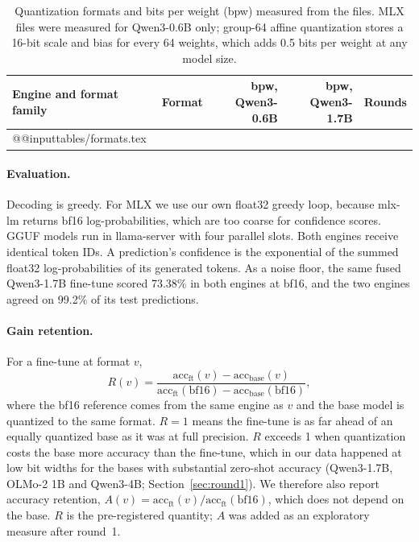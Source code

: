 \documentclass[11pt,letterpaper]{article}
\makeatletter
\newcommand*{\tablerows}[1]{\csname @@input\endcsname #1 }
\makeatother
\begin{document}
\begin{table}[htbp]
\centering\small
\caption{Quantization formats and bits per weight (bpw) measured from the files. MLX files were measured for Qwen3-0.6B only; group-64 affine quantization stores a 16-bit scale and bias for every 64 weights, which adds 0.5 bits per weight at any model size.}
\label{tab:formats}
\begin{tabular}{llrrl}
\toprule
Engine and format family & Format & bpw, Qwen3-0.6B & bpw, Qwen3-1.7B & Rounds \\
\midrule
\tablerows{tables/formats.tex}
\bottomrule
\end{tabular}
\end{table}

\paragraph{Evaluation.} Decoding is greedy. For MLX we use our own float32 greedy loop, because mlx-lm returns bf16 log-probabilities, which are too coarse for confidence scores. GGUF models run in llama-server with four parallel slots. Both engines receive identical token IDs. A prediction's confidence is the exponential of the summed float32 log-probabilities of its generated tokens. As a noise floor, the same fused Qwen3-1.7B fine-tune scored 73.38\% in both engines at bf16, and the two engines agreed on 99.2\% of its test predictions.

\paragraph{Gain retention.} For a fine-tune at format $v$,
\begin{equation}
R(v) = \frac{\mathrm{acc}_{\mathrm{ft}}(v) - \mathrm{acc}_{\mathrm{base}}(v)}{\mathrm{acc}_{\mathrm{ft}}(\mathrm{bf16}) - \mathrm{acc}_{\mathrm{base}}(\mathrm{bf16})},
\end{equation}
where the bf16 reference comes from the same engine as $v$ and the base model is quantized to the same format. $R = 1$ means the fine-tune is as far ahead of an equally quantized base as it was at full precision. $R$ exceeds 1 when quantization costs the base more accuracy than the fine-tune, which in our data happened at low bit widths for the bases with substantial zero-shot accuracy (Qwen3-1.7B, OLMo-2 1B and Qwen3-4B; Section~\ref{sec:round1}). We therefore also report accuracy retention, $A(v) = \mathrm{acc}_{\mathrm{ft}}(v) / \mathrm{acc}_{\mathrm{ft}}(\mathrm{bf16})$, which does not depend on the base. $R$ is the pre-registered quantity; $A$ was added as an exploratory measure after round~1.
\end{document}
